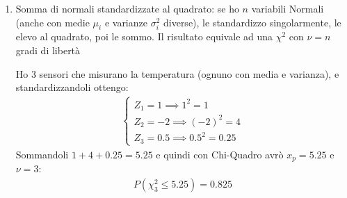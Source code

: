 \documentclass{article}  %
\theoremstyle{definition}
\begin{document}
\begin{enumerate}
\begin{align*}
		      \sum_{i=1}^{n} X_i \sim \chi^2_v \quad \text{ con } \quad \nu = \sum_{i=1}^{n}\nu_i
	      \end{align*}
	      \begin{esempio}
		      Siano:
		      \begin{align*}
			      \begin{cases}
				      X_1 \sim \chi^2_2 \\
				      X_2 \sim \chi^2_3 \\
				      X_3 \sim \chi^2_5
			      \end{cases}
		      \end{align*}
		      la loro somma sarà:
		      \begin{align*}
			      X_1+X_2+X_3 \text{ con } \nu = 2+3+5=10 \text{ gradi di libertà } \implies X_1+X_2+X_3 \sim \chi^2_{10}
		      \end{align*}
	      \end{esempio}
	\item Somma di normali standardizzate al quadrato: se ho $n$ variabili Normali (anche con medie $\mu_i$ e varianze $\sigma_i^2$ diverse), le standardizzo singolarmente, le elevo al quadrato,
	      poi le sommo. Il risultato equivale ad una $\chi^2$ con $\nu = n$ gradi di libertà
	      \begin{esempio}
		      Ho 3 sensori che misurano la temperatura (ognuno con media e varianza), e standardizzandoli ottengo:
		      \begin{align*}
			      \begin{cases}
				      Z_1 = 1 \implies 1^2=1       \\
				      Z_2 = -2 \implies (-2)^2 = 4 \\
				      Z_3 = 0.5 \implies 0.5^2 = 0.25
			      \end{cases}
		      \end{align*}
		      Sommandoli $1+4+0.25=5.25$ e quindi con Chi-Quadro avrò $x_p=5.25$ e $\nu=3$:
		      \begin{align*}
			      P(\chi^2_3 \leq 5.25) = 0.825
		      \end{align*}
	      \end{esempio}
\end{enumerate}
\end{document}
